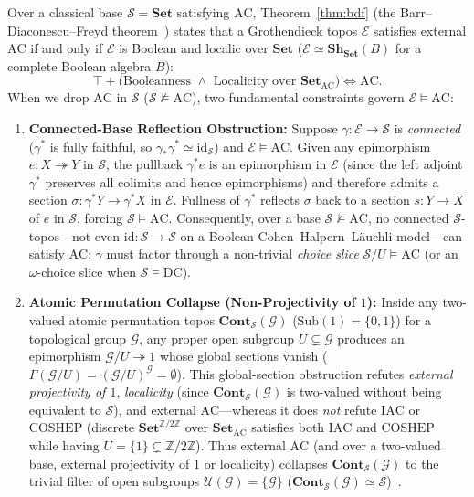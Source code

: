 \documentclass[10pt,twoside,openright]{book}
\theoremstyle{crmplain}
\theoremstyle{crmdef}
\theoremstyle{crmremark}
\begin{document}
Over a classical base $\mathcal{S} = \mathbf{Set}$ satisfying $\mathrm{AC}$, Theorem~\ref{thm:bdf} (the Barr--Diaconescu--Freyd theorem~\cite{Barr74,Diaconescu75,Freyd72}) states that a Grothendieck topos $\mathcal{E}$ satisfies external $\mathrm{AC}$ if and only if $\mathcal{E}$ is Boolean and localic over $\mathbf{Set}$ ($\mathcal{E} \simeq \mathbf{Sh}_{\mathbf{Set}}(B)$ for a complete Boolean algebra $B$):
\[
  \top + \bigl(\text{Booleanness } \wedge \text{ Localicity over } \mathbf{Set}_{\mathrm{AC}}\bigr) \iff \mathrm{AC}.
\]
When we drop $\mathrm{AC}$ in $\mathcal{S}$ ($\mathcal{S} \not\models \mathrm{AC}$), two fundamental constraints govern $\mathcal{E} \models \mathrm{AC}$:
\begin{enumerate}[label=\textup{(\arabic*)},leftmargin=2.0em]
  \item \textbf{Connected-Base Reflection Obstruction:} Suppose $\gamma : \mathcal{E} \to \mathcal{S}$ is \emph{connected} ($\gamma^*$ is fully faithful, so $\gamma_* \gamma^* \simeq \mathrm{id}_{\mathcal{S}}$) and $\mathcal{E} \models \mathrm{AC}$. Given any epimorphism $e : X \twoheadrightarrow Y$ in $\mathcal{S}$, the pullback $\gamma^* e$ is an epimorphism in $\mathcal{E}$ (since the left adjoint $\gamma^*$ preserves all colimits and hence epimorphisms) and therefore admits a section $\sigma : \gamma^* Y \to \gamma^* X$ in $\mathcal{E}$. Fullness of $\gamma^*$ reflects $\sigma$ back to a section $s : Y \to X$ of $e$ in $\mathcal{S}$, forcing $\mathcal{S} \models \mathrm{AC}$. Consequently, over a base $\mathcal{S} \not\models \mathrm{AC}$, no connected $\mathcal{S}$-topos---not even $\mathrm{id} : \mathcal{S} \to \mathcal{S}$ on a Boolean Cohen--Halpern--Läuchli model---can satisfy $\mathrm{AC}$; $\gamma$ must factor through a non-trivial \emph{choice slice} $\mathcal{S}/U \models \mathrm{AC}$ (or an $\omega$-choice slice when $\mathcal{S} \models \mathrm{DC}$).
  \item \textbf{Atomic Permutation Collapse (Non-Projectivity of $1$):} Inside any two-valued atomic permutation topos $\mathbf{Cont}_{\mathcal{S}}(\mathcal{G})$ ($\mathrm{Sub}(1) = \{0,1\}$) for a topological group $\mathcal{G}$, any proper open subgroup $U \subsetneq \mathcal{G}$ produces an epimorphism $\mathcal{G}/U \twoheadrightarrow 1$ whose global sections vanish ($\Gamma(\mathcal{G}/U) = (\mathcal{G}/U)^{\mathcal{G}} = \emptyset$). This global-section obstruction refutes \emph{external projectivity of $1$}, \emph{localicity} (since $\mathbf{Cont}_{\mathcal{S}}(\mathcal{G})$ is two-valued without being equivalent to $\mathcal{S}$), and external $\mathrm{AC}$---whereas it does \emph{not} refute $\mathrm{IAC}$ or $\mathrm{COSHEP}$ (discrete $\mathbf{Set}^{\mathbb{Z}/2\mathbb{Z}}$ over $\mathbf{Set}_{\mathrm{AC}}$ satisfies both $\mathrm{IAC}$ and $\mathrm{COSHEP}$ while having $U = \{1\} \subsetneq \mathbb{Z}/2\mathbb{Z}$). Thus external $\mathrm{AC}$ (and over a two-valued base, external projectivity of $1$ or localicity) collapses $\mathbf{Cont}_{\mathcal{S}}(\mathcal{G})$ to the trivial filter of open subgroups $\mathcal{U}(\mathcal{G}) = \{\mathcal{G}\}$ ($\mathbf{Cont}_{\mathcal{S}}(\mathcal{G}) \simeq \mathcal{S}$)~\cite{Johnstone02,Kihara26}.
\end{enumerate}
\end{document}
